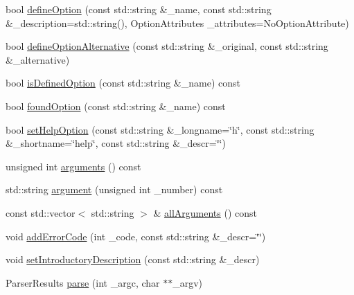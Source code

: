 \begin{DoxyCompactItemize}
\item 
bool \hyperlink{class_command_line_processing_1_1_argv_parser_ab0194879d739c6e14afaa5c810f2bcf2}{define\-Option} (const std\-::string \&\-\_\-name, const std\-::string \&\-\_\-description=std\-::string(), Option\-Attributes \-\_\-attributes=No\-Option\-Attribute)
\item 
bool \hyperlink{class_command_line_processing_1_1_argv_parser_afd327b1fa074f9054180ffe67cb39591}{define\-Option\-Alternative} (const std\-::string \&\-\_\-original, const std\-::string \&\-\_\-alternative)
\item 
bool \hyperlink{class_command_line_processing_1_1_argv_parser_aff6f41358d5e0f4f2a3eb83069a1e4eb}{is\-Defined\-Option} (const std\-::string \&\-\_\-name) const 
\item 
bool \hyperlink{class_command_line_processing_1_1_argv_parser_aee7ea44fd5f1caac3f96915a483fbe77}{found\-Option} (const std\-::string \&\-\_\-name) const 
\item 
bool \hyperlink{class_command_line_processing_1_1_argv_parser_a3c8f22197ce39d35655195b6d34ee2e1}{set\-Help\-Option} (const std\-::string \&\-\_\-longname=\char`\"{}h\char`\"{}, const std\-::string \&\-\_\-shortname=\char`\"{}help\char`\"{}, const std\-::string \&\-\_\-descr=\char`\"{}\char`\"{})
\item 
unsigned int \hyperlink{class_command_line_processing_1_1_argv_parser_ac982ebf837b576898661c0bfeeb487ec}{arguments} () const 
\item 
std\-::string \hyperlink{class_command_line_processing_1_1_argv_parser_a1cbefd19d4c8c62a203d1a1922960331}{argument} (unsigned int \-\_\-number) const 
\item 
const std\-::vector$<$ std\-::string $>$ \& \hyperlink{class_command_line_processing_1_1_argv_parser_a59bfb6a90912a429100a6e05a6544b36}{all\-Arguments} () const 
\item 
void \hyperlink{class_command_line_processing_1_1_argv_parser_ad0150ccee56870979c638be0dbb1ceb9}{add\-Error\-Code} (int \-\_\-code, const std\-::string \&\-\_\-descr=\char`\"{}\char`\"{})
\item 
void \hyperlink{class_command_line_processing_1_1_argv_parser_a2e94bfc66abdfc54fb506c75c3ce919c}{set\-Introductory\-Description} (const std\-::string \&\-\_\-descr)
\item 
Parser\-Results \hyperlink{class_command_line_processing_1_1_argv_parser_a1a3306fa666ee4619ecd5dfcfb2bd7ba}{parse} (int \-\_\-argc, char $\ast$$\ast$\-\_\-argv)
$$
\end{DoxyCompactItemize}
